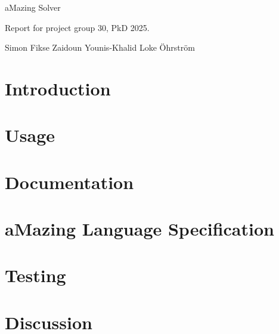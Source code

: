 \documentclass[12pt, a4paper]{article}
\begin{document}
\begin{titlepage}
    \vspace*{\fill}
    \begin{center}

        \begin{LARGE}
            aMazing Solver
        \end{LARGE}

        \vspace{5mm}

        \begin{large}
            Report for project group 30, PkD 2025.
        \end{large}

        \vspace{5mm}

        Simon Fikse \quad Zaidoun Younis-Khalid \quad Loke Öhrström

    \end{center}
    \vspace*{\fill}
\end{titlepage}

\newpage
\tableofcontents
\newpage

\section{Introduction}


\section{Usage}

\newpage

\section{Documentation}

\newpage

\section{aMazing Language Specification}

\newpage

\section{Testing}

\newpage

\section{Discussion}

\newpage



\end{document}
